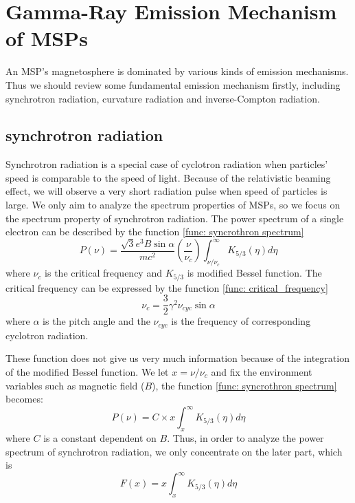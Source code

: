 \documentclass[12pt]{report}
\begin{document}
      \section{Gamma-Ray Emission Mechanism of MSPs}
        An MSP's magnetosphere is dominated by various kinds of emission mechanisms. Thus we should review some 
        fundamental emission mechanism firstly, including synchrotron radiation, curvature radiation and 
        inverse-Compton radiation.
        
        \subsection{synchrotron radiation}
          Synchrotron radiation is a special case of cyclotron radiation when particles' speed is comparable to the 
          speed of light. Because of the relativistic beaming effect, we will observe a very short radiation pulse 
          when speed of particles is large. 
          We only aim to analyze the spectrum properties of MSPs, so we focus on the 
          spectrum property of synchrotron radiation. The power spectrum of a single electron  
          can be described by the function \ref{func: syncrothron spectrum}
          \begin{equation}
            \label{func: syncrothron spectrum}
            P\left(\nu\right) = \frac{\sqrt{3} e^3 B \sin{\alpha}}{m c^2} 
              \left(\frac{\nu}{\nu_c}\right) \int_{\nu / \nu_c}^{\infty} K_{5/3}\left(\eta \right)d\eta 
          \end{equation}
          where $\nu_c$ is the critical frequency and $K_{5/3}$ is modified Bessel function. The critical frequency 
          can be expressed by the function \ref{func: critical_frequency}
          \begin{equation}
            \label{func: critical_frequency}
            \nu_c = \frac{3}{2} \gamma^2 \nu_{cyc} \sin{\alpha}
          \end{equation} 
          where $\alpha$ is the pitch angle and the $\nu_{cyc}$ is the frequency of corresponding cyclotron radiation. 

          These function does not give us very much information because of the integration of the modified Bessel 
          function. We let $x = \nu / \nu_c$ and fix the environment variables such as magnetic field ($B$), 
          the function \ref{func: syncrothron spectrum} becomes: 
          \begin{equation}
            \label{func: to_x}
            P\left(\nu\right) = C \times x \int_{x}^{\infty} K_{5/3}\left(\eta \right)d\eta 
          \end{equation}
          where $C$ is a constant dependent on $B$. Thus, in order to analyze the power spectrum of synchrotron radiation,
          we only concentrate on the later part, which is 
          \begin{equation}
            \label{func: fx}
            F\left(x\right) = x \int_{x}^{\infty} K_{5/3}\left(\eta \right)d\eta 
          \end{equation}
          
\end{document}
